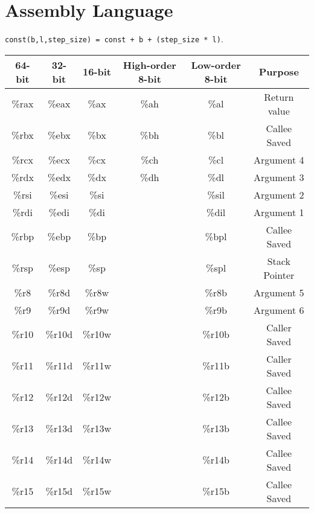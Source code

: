 \documentclass[11pt]{article}
\begin{document}
\section{Assembly Language}
\texttt{const(b,l,step\_size) = const + b + (step\_size * l)}. \\
\begin{tabular}{|c|c|c|c|c|c|}
\hline
64-bit & 32-bit & 16-bit & High-order 8-bit & Low-order 8-bit & Purpose      \\
\hline
\%rax  & \%eax  & \%ax   & \%ah             & \%al            & Return value \\
\hline
\%rbx  & \%ebx  & \%bx   & \%bh             & \%bl            & Callee Saved \\
\hline
\%rcx  & \%ecx  & \%cx   & \%ch             & \%cl            & Argument 4   \\
\hline
\%rdx  & \%edx  & \%dx   & \%dh             & \%dl            & Argument 3   \\
\hline
\%rsi  & \%esi  & \%si   &                  & \%sil           & Argument 2   \\
\hline
\%rdi  & \%edi  & \%di   &                  & \%dil           & Argument 1   \\
\hline
\%rbp  & \%ebp  & \%bp   &                  & \%bpl           & Callee Saved \\
\hline
\%rsp  & \%esp  & \%sp   &                  & \%spl           & Stack Pointer\\
\hline
\%r8   & \%r8d  & \%r8w  &                  & \%r8b           & Argument 5   \\
\hline
\%r9   & \%r9d  & \%r9w  &                  & \%r9b           & Argument 6   \\
\hline
\%r10  & \%r10d & \%r10w &                  & \%r10b          & Caller Saved \\
\hline
\%r11  & \%r11d & \%r11w &                  & \%r11b          & Caller Saved \\
\hline
\%r12  & \%r12d & \%r12w &                  & \%r12b          & Callee Saved \\
\hline
\%r13  & \%r13d & \%r13w &                  & \%r13b          & Callee Saved \\
\hline
\%r14  & \%r14d & \%r14w &                  & \%r14b          & Callee Saved \\
\hline
\%r15  & \%r15d & \%r15w &                  & \%r15b          & Callee Saved \\
\hline
\end{tabular}
\end{document}
